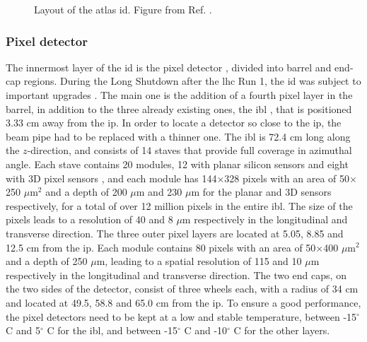 \begin{figure}[ht]
\centering
{}
\caption{Layout of the \gls{atlas} \gls{id}. Figure from Ref. \cite{Potamianos:2016ptf}.}
\label{fig:atlas:id}
\end{figure}


\subsubsection*{Pixel detector}
\label{sec:atlas:pixel}
The innermost layer of the \gls{id} is the pixel detector \cite{Aad:2008zz}, divided into barrel and end-cap regions. 
During the Long Shutdown after the \gls{lhc} Run 1, the \gls{id} was subject to important upgrades \cite{Potamianos:2016ptf}. 
The main one is the addition of a fourth pixel layer in the barrel, in addition to the three already existing ones, 
the \gls{ibl} \cite{Capeans:1291633}, that is positioned 3.33 cm away from the \gls{ip}. 
In order to locate a detector so close to the \gls{ip}, the beam pipe had to be replaced with a thinner one. 
The \gls{ibl} is 72.4 cm long along the $z$-direction, and consists of 14 staves that provide full coverage in azimuthal angle. Each stave contains 20 modules, 12 with planar silicon sensors and eight with 3D pixel sensors \cite{1748-0221-7-11-P11010}, and each module has 144$\times$328 pixels with an area of 50$\times$250 $\mu$m$^2$ and a depth of 200 $\mu$m and 230 $\mu$m for the planar and 3D sensors respectively, 
for a total of over 12 million pixels in the entire \gls{ibl}. The size of the pixels leads to a resolution of 40 and 8 $\mu$m respectively in the longitudinal and transverse direction. 
The three outer pixel layers are located at 5.05, 8.85 and 12.5 cm from the \gls{ip}. 
Each module contains 80 pixels with an area of 50$\times$400 $\mu$m$^2$ and a depth of 250 $\mu$m, leading to a spatial resolution of 115 and 10 $\mu$m respectively in the longitudinal and transverse direction. 
The two end caps, on the two sides of the detector, consist of three wheels each, with a radius of 34 cm and located at 49.5, 58.8 and 65.0 cm from the \gls{ip}. 
To ensure a good performance, the pixel detectors need to be kept at a low and stable temperature, 
between -15$^{\circ}$ C and 5$^{\circ}$ C for the \gls{ibl}, and between -15$^{\circ}$ C and -10$^{\circ}$ C for the other layers.

